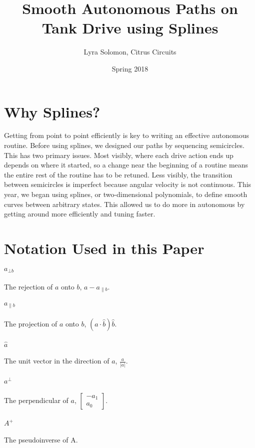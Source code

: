 \documentclass{article}
\title{Smooth Autonomous Paths on Tank Drive using Splines}
\date{Spring 2018}
\author{Lyra Solomon, Citrus Circuits}
\begin{document}
\maketitle

\section{Why Splines?}
Getting from point to point efficiently is key to writing an effective autonomous routine.
Before using splines, we designed our paths by sequencing semicircles. This has two primary
issues. Most visibly, where each drive action ends up depends on where it started, so a
change near the beginning of a routine means the entire rest of the routine has to be retuned.
Less visibly, the transition between semicircles is imperfect because angular velocity is
not continuous. This year, we began using splines, or two-dimensional polynomials, to define
smooth curves between arbitrary states. This allowed us to do more in autonomous by getting
around more efficiently and tuning faster.

\section{Notation Used in this Paper}
\paragraph{$a_{\bot b}$} The rejection of $a$ onto $b$, $a-a_{\parallel b}$.
\paragraph{$a_{\parallel b}$} The projection of $a$ onto $b$, $(a \cdot \hat{b}) \hat{b}$.
\paragraph{$\hat{a}$} The unit vector in the direction of $a$, $\frac{a}{\lvert a \rvert}$.
\paragraph{$a^\bot$} The perpendicular of $a$, $\begin{bmatrix} -a_1 \\ a_0 \end{bmatrix}$.
\paragraph{$A^+$} The pseudoinverse of A.
\end{document}
